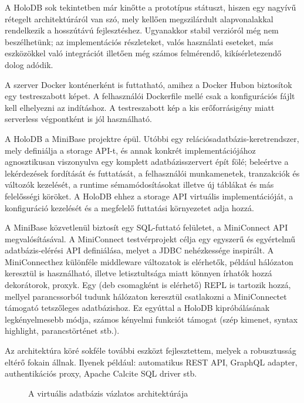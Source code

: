 \documentclass[
    parspace,
    noindent,
    nohyp,
]{elteiktdk}[2023/04/10]
\begin{document}
A HoloDB sok tekintetben már kinőtte a prototípus státuszt,
hiszen egy nagyívű rétegelt architektúráról van szó,
mely kellően megszilárdult alapvonalakkal rendelkezik a hosszútávú fejlesztéshez.
Ugyanakkor stabil verzióról még nem beszélhetünk;
az implementációs részleteket, valós használati eseteket,
más eszközökkel való integrációt illetően még számos felmérendő, kikísérletezendő dolog adódik.

A szerver Docker konténerként is futtatható, amihez a Docker Hubon biztosítok egy testreszabott képet.
A felhasználói Dockerfile mellé csak a konfigurációs fájlt kell elhelyezni az indításhoz.
A testreszabott kép a kis erőforrásigény miatt serverless végpontként is jól használható.

A HoloDB a MiniBase projektre épül.
Utóbbi egy relációsadatbázis-keretrendszer, mely definiálja a storage API-t,
és annak konkrét implementációjához agnosztikusan viszonyulva
egy komplett adatbázisszervert épít fölé;
beleértve a lekérdezések fordítását és futtatását,
a felhasználói munkamenetek, tranzakciók és változók kezelését,
a runtime sémamódosításokat illetve új táblákat és más felelősségi köröket.
A HoloDB ehhez a storage API virtuális implementációját,
a konfiguráció kezelését
és a megfelelő futtatási környezetet adja hozzá.

A MiniBase közvetlenül biztosít egy SQL-futtató felületet, a MiniConnect API megvalósításával.
A MiniConnect testvérprojekt célja egy egyszerű és egyértelmű adatbázis-elérési API definiálása,
melyet a JDBC nehézkessége inspirált.
A MiniConnecthez különféle middleware változatok is elérhetők, például hálózaton keresztül is használható,
illetve letisztultsága miatt könnyen írhatók hozzá dekorátorok, proxyk.
Egy (deb csomagként is elérhető) REPL is tartozik hozzá,
mellyel parancssorból tudunk hálózaton keresztül csatlakozni a MiniConnectet támogató tetszőleges adatbázishoz.
Ez egyúttal a HoloDB kipróbálásának legkényelmesebb módja,
számos kényelmi funkciót támogat (szép kimenet, syntax highlight, parancstörténet stb.).

Az architektúra köré sokféle további eszközt fejlesztettem,
melyek a robusztusság eltérő fokain állnak.
Ilyenek például: automatikus REST API, GraphQL adapter, authentikációs proxy, Apache Calcite SQL driver stb.

\begin{figure}[H]
\centering

\caption{A virtuális adatbázis vázlatos architektúrája}
\end{figure}
\end{document}
